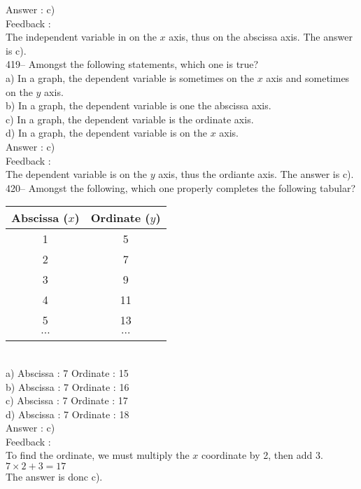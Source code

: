 \documentclass[letterpaper, 12pt]{article}
\begin{document}
Answer : c)\\

Feedback :\\
The independent variable in on the $x$ axis, thus on the abscissa axis. The answer is c).\\

419-- Amongst the following statements, which one is true?\\
a) In a graph, the dependent variable is sometimes on the $x$ axis and sometimes on the $y$ axis.  \\
b) In a graph, the dependent variable is one the abscissa axis.\\
c) In a graph, the dependent variable is the ordinate axis.\\
d) In a graph, the dependent variable is on the $x$ axis.\\

Answer : c)\\

Feedback :\\
The dependent variable is on the $y$ axis, thus the ordiante axis.  The answer is c).\\


420-- Amongst the following, which one properly completes the following tabular?\\
\begin{tabular}{|c|c|} \hline
{\bf Abscissa ($x$)} & {\bf Ordinate ($y$)}  \\ \hline \hline

1 & 5 \\ \hline
2 & 7 \\ \hline
3 & 9 \\ \hline
4 & 11 \\ \hline
5 & 13 \\ \hline
$\ldots$ & $\ldots$ \\ \hline
\multicolumn{2}{c}{}\\
\end{tabular}\\
a) Abscissa : 7 \qquad Ordinate : 15\\
b) Abscissa : 7 \qquad Ordinate : 16\\
c) Abscissa : 7 \qquad Ordinate : 17\\
d) Abscissa : 7 \qquad Ordinate : 18\\

Answer : c)\\

Feedback :\\
To find the ordinate, we must multiply the $x$ coordinate by 2,
then add 3.  \\
$7\times2+3=17$\\
The answer is donc c).\\
\end{document}
